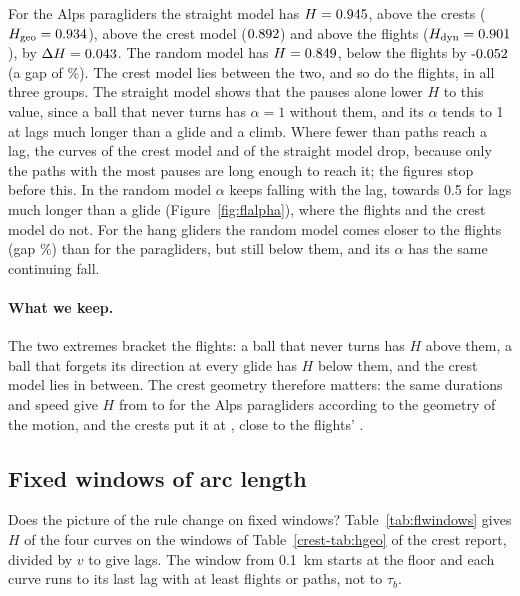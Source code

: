 \documentclass[11pt,a4paper]{article}
\newcommand{\Hgeo}{H_{\mathrm{geo}}}
\begin{document}
For the Alps paragliders the straight model has $H = 0.945$, above the crests ($\Hgeo = \flHGeoAlpsPara$),
above the crest model ($0.892$) and above the flights ($H_{\mathrm{dyn}} = 0.901$), by $\Delta H =
0.043$. The random model has $H = 0.849$, below the flights by $\flNullDHRandomAlpsPara$
(a gap of \flNullGapRandomAlpsPara\%). The crest model lies between the two, and so do the flights, in all three groups. The
straight model shows that the pauses alone lower $H$ to this value, since a ball that never turns has $\alpha = 1$ without
them, and its $\alpha$ tends to 1 at lags much longer than a glide and a climb. Where fewer than \flMinRows{} paths reach a lag, the
curves of the crest model and of the straight model drop, because only the paths with the most pauses are long enough to reach
it; the figures stop before this. In the random model $\alpha$ keeps falling with the lag, towards 0.5 for lags much longer than a glide
(Figure~\ref{fig:flalpha}), where the flights and the crest model do not. For the hang gliders the random model comes
closer to the flights (gap \flNullGapRandomAlpsHang\%) than for the paragliders, but still below them, and its $\alpha$ has the
same continuing fall.

\paragraph{What we keep.} The two extremes bracket the flights: a ball that never turns has $H$ above them, a ball that
forgets its direction at every glide has $H$ below them, and the crest model lies in between. The crest geometry
therefore matters: the same durations and speed give $H$ from \flHRandomAlpsPara{} to \flHStraightAlpsPara{} for the Alps
paragliders according to the geometry of the motion, and the crests put it at \flHModAlpsPara, close to the flights' \flHDynAlpsPara.

\subsection{Fixed windows of arc length}\label{sec:flwindows}

Does the picture of the rule change on fixed windows? Table~\ref{tab:flwindows} gives $H$ of the four curves on
the windows of Table~\ref{crest-tab:hgeo} of the crest report, divided by $v$ to give lags. The window from 0.1~km starts at the floor and each curve runs to its last lag with
at least \flMinRows{} flights or paths, not to $\tau_b$.
\end{document}
